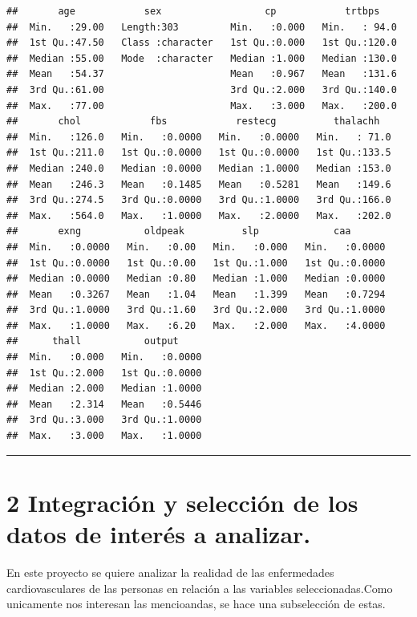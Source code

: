 \documentclass[
]{article}
\begin{document}
\begin{verbatim}
##       age            sex                  cp            trtbps     
##  Min.   :29.00   Length:303         Min.   :0.000   Min.   : 94.0  
##  1st Qu.:47.50   Class :character   1st Qu.:0.000   1st Qu.:120.0  
##  Median :55.00   Mode  :character   Median :1.000   Median :130.0  
##  Mean   :54.37                      Mean   :0.967   Mean   :131.6  
##  3rd Qu.:61.00                      3rd Qu.:2.000   3rd Qu.:140.0  
##  Max.   :77.00                      Max.   :3.000   Max.   :200.0  
##       chol            fbs            restecg          thalachh    
##  Min.   :126.0   Min.   :0.0000   Min.   :0.0000   Min.   : 71.0  
##  1st Qu.:211.0   1st Qu.:0.0000   1st Qu.:0.0000   1st Qu.:133.5  
##  Median :240.0   Median :0.0000   Median :1.0000   Median :153.0  
##  Mean   :246.3   Mean   :0.1485   Mean   :0.5281   Mean   :149.6  
##  3rd Qu.:274.5   3rd Qu.:0.0000   3rd Qu.:1.0000   3rd Qu.:166.0  
##  Max.   :564.0   Max.   :1.0000   Max.   :2.0000   Max.   :202.0  
##       exng           oldpeak          slp             caa        
##  Min.   :0.0000   Min.   :0.00   Min.   :0.000   Min.   :0.0000  
##  1st Qu.:0.0000   1st Qu.:0.00   1st Qu.:1.000   1st Qu.:0.0000  
##  Median :0.0000   Median :0.80   Median :1.000   Median :0.0000  
##  Mean   :0.3267   Mean   :1.04   Mean   :1.399   Mean   :0.7294  
##  3rd Qu.:1.0000   3rd Qu.:1.60   3rd Qu.:2.000   3rd Qu.:1.0000  
##  Max.   :1.0000   Max.   :6.20   Max.   :2.000   Max.   :4.0000  
##      thall           output      
##  Min.   :0.000   Min.   :0.0000  
##  1st Qu.:2.000   1st Qu.:0.0000  
##  Median :2.000   Median :1.0000  
##  Mean   :2.314   Mean   :0.5446  
##  3rd Qu.:3.000   3rd Qu.:1.0000  
##  Max.   :3.000   Max.   :1.0000
\end{verbatim}

\begin{center}\rule{0.5\linewidth}{0.5pt}\end{center}

\hypertarget{integraciuxf3n-y-selecciuxf3n-de-los-datos-de-interuxe9s-a-analizar.}{%
\section{2 Integración y selección de los datos de interés a
analizar.}\label{integraciuxf3n-y-selecciuxf3n-de-los-datos-de-interuxe9s-a-analizar.}}

En este proyecto se quiere analizar la realidad de las enfermedades
cardiovasculares de las personas en relación a las variables
seleccionadas.Como unicamente nos interesan las mencioandas, se hace una
subselección de estas.
\end{document}
